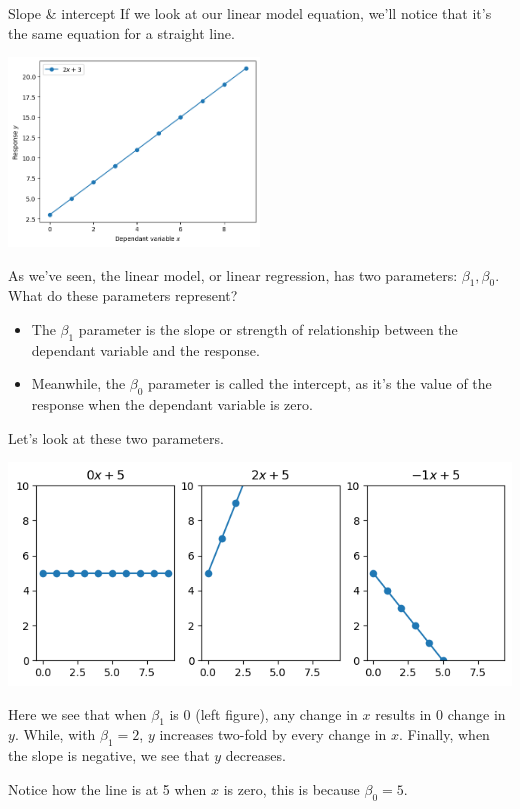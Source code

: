 \documentclass[10pt]{beamer}
\begin{document}
\begin{frame}[fragile,allowframebreaks,label=]{Slope \& intercept}
If we look at our linear model equation, we'll notice that it's the same equation for a straight line.

\begin{center}
\includegraphics[width=0.5\textwidth]{images/linear_model.png}
\end{center}

As we've seen, the linear model, or linear regression, has two parameters: \(\beta_1,
\beta_0\). What do these parameters represent?

\begin{itemize}
\item The \(\beta_1\) parameter is the \alert{slope} or strength of relationship between the dependant
variable and the response.
\item Meanwhile, the \(\beta_0\) parameter is called the \alert{intercept}, as it's the value of the
response when the dependant variable is zero.
\end{itemize}

Let's look at these two parameters.

\begin{center}
\includegraphics[width=.9\linewidth]{images/slope_1.png}
\end{center}

Here we see that when \(\beta_1\) is 0 (left figure), any change in \(x\) results in 0 change
in \(y\). While, with \(\beta_1 = 2\), \(y\) increases two-fold by every change in \(x\). Finally,
when the slope is negative, we see that \(y\) decreases.

Notice how the line is at 5 when \(x\) is zero, this is because \(\beta_0 = 5\).
\end{frame}
\end{document}
